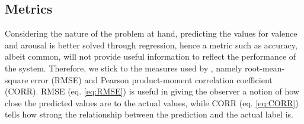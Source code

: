 


\subsection{Metrics} \label{sec:Metrics}
Considering the nature of the problem at hand, predicting the values for valence and arousal is better solved through regression, hence a metric such as accuracy, albeit common, will not provide useful information to reflect the performance of the system. Therefore, we stick to the measures used by \citet{Kossaifi:2017:AFEW-VADatabase}, namely root-mean-square error (RMSE) and Pearson product-moment correlation coefficient (CORR). 
\newline\newline
RMSE (eq. \ref{eq:RMSE}) is useful in giving the observer a notion of how close the predicted values are to the actual values, while CORR (eq. \ref{eq:CORR}) tells how strong the relationship between the prediction and the actual label is. \citep{2020:RMSE} \citep{2020:PearsonCorrelation}
  
